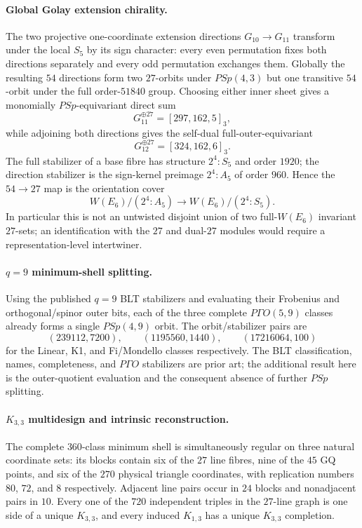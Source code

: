 \paragraph{Global Golay extension chirality.}
The two projective one-coordinate extension directions $G_{10}\to G_{11}$ transform under the local $S_5$ by its sign character: every even permutation fixes both directions separately and every odd permutation exchanges them.  Globally the resulting $54$ directions form two $27$-orbits under $PSp(4,3)$ but one transitive $54$-orbit under the full order-$51840$ group.  Choosing either inner sheet gives a monomially $PSp$-equivariant direct sum
\[
 G_{11}^{\oplus27}=[297,162,5]_3,
\]
while adjoining both directions gives the self-dual full-outer-equivariant
\[
 G_{12}^{\oplus27}=[324,162,6]_3.
\]
The full stabilizer of a base fibre has structure $2^4{:}S_5$ and order $1920$; the direction stabilizer is the sign-kernel preimage $2^4{:}A_5$ of order $960$.  Hence the $54\to27$ map is the orientation cover
\[
 W(E_6)/(2^4{:}A_5)\longrightarrow W(E_6)/(2^4{:}S_5).
\]
In particular this is not an untwisted disjoint union of two full-$W(E_6)$ invariant $27$-sets; an identification with the $27$ and dual-$27$ modules would require a representation-level intertwiner.

\paragraph{$q=9$ minimum-shell splitting.}
Using the published $q=9$ BLT stabilizers and evaluating their Frobenius and orthogonal/spinor outer bits, each of the three complete $P\Gamma O(5,9)$ classes already forms a single $PSp(4,9)$ orbit.  The orbit/stabilizer pairs are
\[
 (239112,7200),\qquad (1195560,1440),\qquad (17216064,100)
\]
for the Linear, K1, and Fi/Mondello classes respectively.  The BLT classification, names, completeness, and $P\Gamma O$ stabilizers are prior art; the additional result here is the outer-quotient evaluation and the consequent absence of further $PSp$ splitting.

\paragraph{$K_{3,3}$ multidesign and intrinsic reconstruction.}
The complete $360$-class minimum shell is simultaneously regular on three natural coordinate sets: its blocks contain six of the $27$ line fibres, nine of the $45$ GQ points, and six of the $270$ physical triangle coordinates, with replication numbers $80$, $72$, and $8$ respectively.  Adjacent line pairs occur in $24$ blocks and nonadjacent pairs in $10$.  Every one of the $720$ independent triples in the $27$-line graph is one side of a unique $K_{3,3}$, and every induced $K_{1,3}$ has a unique $K_{3,3}$ completion.

